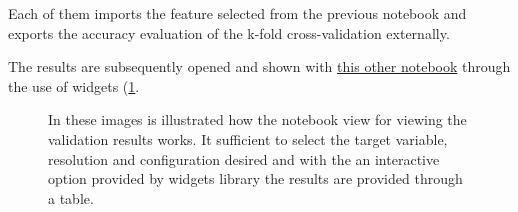 Each of them imports the feature selected from the previous notebook and exports the accuracy evaluation of the k-fold cross-validation externally. \par
The results are subsequently opened and shown with \href{https://github.com/opengeolab/D-DUST/blob/thesis_MB/notebooks/model.ipynb}{this other notebook} through the use of widgets (\ref{fig:view}.
\begin{figure}[H] 
    \centering
    \hfill%
    \caption{In these images is illustrated how the notebook view for viewing the validation results works. It sufficient to select the target variable, resolution and configuration desired and with the an interactive option provided by widgets library the results are provided through a table.}
    \label{fig:view}
\end{figure}

